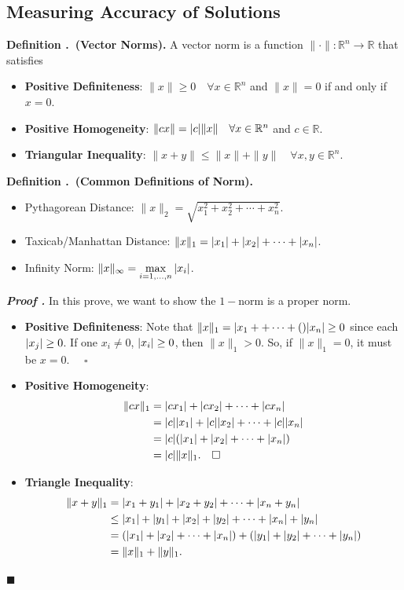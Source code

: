 \documentclass[12pt, a4paper]{article}
\newcounter{index}[subsection]
\newenvironment*{df}[1]{\par\noindent\textbf{Definition \thesubsection.\stepcounter{index}\theindex\ (#1).}}{\par}
\newcounter{nprf}[subsection]
\newenvironment*{prf}{\par\indent\textbf{\textit{Proof \stepcounter{nprf}\thenprf.}}}{\hfill$\blacksquare$\par}
\def\R{{\mathbb{R}}}
\def\dsst{\displaystyle}
\def\pqed{\quad\square}
\begin{document}
\subsection{Measuring Accuracy of Solutions}
\begin{df}{Vector Norms}
	A vector norm is a function $\|\cdot\|:\R^n\to\R$ that satisfies
	\begin{itemize}
		\item \textbf{Positive Definiteness}: $\|x\|\geq0\quad\forall x\in\R^n$ and $\|x\|=0$ if and only if $x=0$.
		\item \textbf{Positive Homogeneity}: $\|cx\|=\qty|c|\|x\|\quad\forall x\in\R^n$ and $c\in\R$.
		\item \textbf{Triangular Inequality}: $\|x+y\|\leq\|x\|+\|y\|\quad\forall x,y\in\R^n$.
	\end{itemize}	
\end{df}
\begin{df}{Common Definitions of Norm}
	\begin{itemize}
		\item Pythagorean Distance: $\|x\|_2=\sqrt{x_1^2+x_2^2+\cdots+x_n^2}$.
		\item Taxicab/Manhattan Distance: $\|x\|_1=\qty|x_1|+\qty|x_2|+\cdots+\qty|x_n|$.
		\item Infinity Norm: $\|x\|_\infty=\dsst\max_{i=1,\dots,n}\qty|x_i|$.
	\end{itemize}	
\end{df}
\begin{prf}
	In this prove, we want to show the $1-$norm is a proper norm.
	\begin{itemize}
		\item \textbf{Positive Definiteness}: Note that $\|x\|_1=\qty|x_1++\cdots+\qty|x_n|\geq0$ since each $\qty|x_j|\geq0$. If one $x_i\neq0$, $\qty|x_i|\geq0$, then $\|x\|_1>0$. So, if $\|x\|_1=0$, it must be $x=0$. $\pqed$
		\item \textbf{Positive Homogeneity}: \begin{align*}\|cx\|_1&=\qty|cx_1|+\qty|cx_2|+\cdots+\qty|cx_n|\\&=\qty|c|\qty|x_1|+\qty|c|\qty|x_2|+\cdots+\qty|c|\qty|x_n|\\&=\qty|c|\qty(\qty|x_1|+\qty|x_2|+\cdots+\qty|x_n|)\\&=\qty|c|\|x\|_1.\pqed\end{align*}
		\item \textbf{Triangle Inequality}: \begin{align*}\|x+y\|_1&=\qty|x_1+y_1|+\qty|x_2+y_2|+\cdots+\qty|x_n+y_n|\\&\leq\qty|x_1|+\qty|y_1|+\qty|x_2|+\qty|y_2|+\cdots+\qty|x_n|+\qty|y_n|\\&=\qty(\qty|x_1|+\qty|x_2|+\cdots+\qty|x_n|)+\qty(\qty|y_1|+\qty|y_2|+\cdots+\qty|y_n|)\\&=\|x\|_1+\|y\|_1.\end{align*}
	\end{itemize}	
\end{prf}
\end{document}
